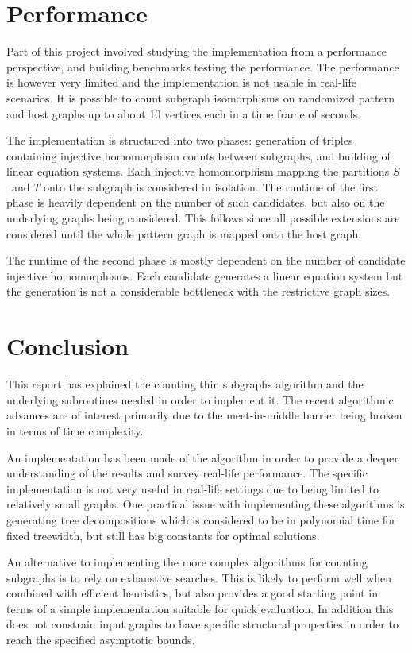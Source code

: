 \documentclass[a4paper,11pt]{report}
\theoremstyle{plain}
\theoremstyle{definition}
\begin{document}
\section{Performance}
Part of this project involved studying the implementation from a performance perspective, and building benchmarks testing the performance.
The performance is however very limited and the implementation is not usable in real-life scenarios.
It is possible to count subgraph isomorphisms on randomized pattern and host graphs up to about 10 vertices each in a time frame of seconds.

The implementation is structured into two phases: generation of triples containing injective homomorphism counts between subgraphs, and building of linear equation systems.
Each injective homomorphism mapping the partitions $S$ and $T$ onto the subgraph is considered in isolation.
The runtime of the first phase is heavily dependent on the number of such candidates, but also on the underlying graphs being considered.
This follows since all possible extensions are considered until the whole pattern graph is mapped onto the host graph.

The runtime of the second phase is mostly dependent on the number of candidate injective homomorphisms.
Each candidate generates a linear equation system but the generation is not a considerable bottleneck with the restrictive graph sizes.

\section{Conclusion}
This report has explained the counting thin subgraphs algorithm and the underlying subroutines needed in order to implement it.
The recent algorithmic advances are of interest primarily due to the meet-in-middle barrier being broken in terms of time complexity.

An implementation has been made of the algorithm in order to provide a deeper understanding of the results and survey real-life performance.
The specific implementation is not very useful in real-life settings due to being limited to relatively small graphs.
One practical issue with implementing these algorithms is generating tree decompositions which is considered to be in polynomial time for fixed treewidth, but still has big constants for optimal solutions.

An alternative to implementing the more complex algorithms for counting subgraphs is to rely on exhaustive searches.
This is likely to perform well when combined with efficient heuristics, but also provides a good starting point in terms of a simple implementation suitable for quick evaluation.
In addition this does not constrain input graphs to have specific structural properties in order to reach the specified asymptotic bounds.
\end{document}
